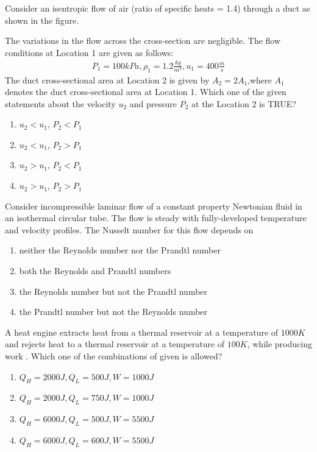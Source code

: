     \item 
    Consider an isentropic flow of air (ratio of specific heats = 1.4) through a duct as shown in the figure.

    The variations in the flow across the cross-section are negligible. The flow conditions at Location 1 are given as follows:
    \begin{align*}
        P_1 = 100kPa, \rho_1 = 1.2 \frac{kg}{m^3}, u_1 = 400\frac{m}{s}
    \end{align*}
    The duct cross-sectional area at Location 2 is given by $A_2 = 2A_1$,where $A_1$ denotes the duct cross-sectional area at Location 1. Which one of the given statements about the velocity $u_2$ and pressure $P_2$ at the Location 2 is TRUE?


    \begin{enumerate}
        \item $u_2 < u_1$, $P_2 < P_1$
        \item $u_2 < u_1$, $P_2 > P_1$
        \item $u_2 > u_1$, $P_2 < P_1$
        \item $u_2 > u_1$, $P_2 > P_1$
    \end{enumerate}

    \item 
    Consider incompressible laminar flow of a constant property Newtonian fluid in an isothermal circular tube. The flow is steady with fully-developed temperature and velocity profiles. The Nusselt number for this flow depends on
    \begin{enumerate}
        \item neither the Reynolds number nor the Prandtl number
        \item both the Reynolds and Prandtl numbers
        \item the Reynolds number but not the Prandtl number
        \item the Prandtl number but not the Reynolds number
    \end{enumerate}

    \item 
    A heat engine extracts heat  from a thermal reservoir at a temperature of $1000 K$ and rejects heat  to a thermal reservoir at a temperature of $100 K$, while producing work . Which one of the combinations of  given is allowed?
    \begin{enumerate}
        \item $Q_H = 2000 J, Q_L = 500 J ,W = 1000 J$
        \item $Q_H = 2000 J, Q_L = 750 J,W = 1000 J$
        \item $Q_H = 6000 J, Q_L = 500 J ,W = 5500J$
        \item $Q_H = 6000 J, Q_L = 600 J ,W = 5500 J$
    \end{enumerate}

